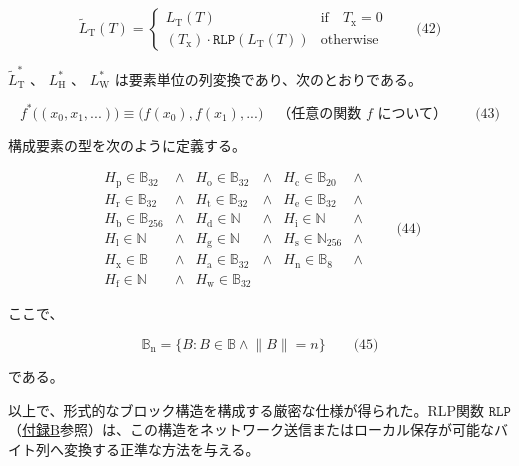 \documentclass[
]{ltjsarticle}
\begin{document}
\protect\hypertarget{eq-42}{}{}

\[\widetilde{L}_{\mathrm{T}}(T) = \begin{cases}
L_{\mathrm{T}}(T) & \text{if} \quad T_{\mathrm{x}} = 0 \\
(T_{\mathrm{x}}) \cdot \mathtt{RLP}(L_{\mathrm{T}}(T)) & \text{otherwise}
\end{cases} \qquad \text{(42)}\]

\protect\hypertarget{general_element_wise_sequence_transformation_f_pow_asterisk}{}{}
\(\widetilde{L}_{\mathrm{T}}^{*}\) 、 \(L_{\mathrm{H}}^{*}\) 、
\(L_{\mathrm{W}}^{*}\) は要素単位の列変換であり、次のとおりである。

\protect\hypertarget{eq-43}{}{}

\[f^{*}\big( (x_0, x_1, ...) \big) \equiv \big( f(x_0), f(x_1), ... \big) \quad \text{（任意の関数 } f \text{ について）} \qquad \text{(43)}\]

構成要素の型を次のように定義する。

\protect\hypertarget{eq-44}{}{}

\[\begin{array}{lclclcl}
H_{\mathrm{p}} \in \mathbb{B}_{32} & \wedge & H_{\mathrm{o}} \in \mathbb{B}_{32} & \wedge & H_{\mathrm{c}} \in \mathbb{B}_{20} & \wedge \\
H_{\mathrm{r}} \in \mathbb{B}_{32} & \wedge & H_{\mathrm{t}} \in \mathbb{B}_{32} & \wedge & H_{\mathrm{e}} \in \mathbb{B}_{32} & \wedge \\
H_{\mathrm{b}} \in \mathbb{B}_{256} & \wedge & H_{\mathrm{d}} \in \mathbb{N} & \wedge & H_{\mathrm{i}} \in \mathbb{N} & \wedge \\
H_{\mathrm{l}} \in \mathbb{N} & \wedge & H_{\mathrm{g}} \in \mathbb{N} & \wedge & H_{\mathrm{s}} \in \mathbb{N}_{256} & \wedge \\
H_{\mathrm{x}} \in \mathbb{B} & \wedge & H_{\mathrm{a}} \in \mathbb{B}_{32} & \wedge & H_{\mathrm{n}} \in \mathbb{B}_{8} & \wedge \\
H_{\mathrm{f}} \in \mathbb{N} & \wedge & H_{\mathrm{w}} \in \mathbb{B}_{32}
\end{array} \qquad \text{(44)}\]

ここで、

\protect\hypertarget{eq-45}{}{}

\[\mathbb{B}_{\mathrm{n}} = \{ B: B \in \mathbb{B} \wedge \lVert B \rVert = n \} \qquad \text{(45)}\]

である。

以上で、形式的なブロック構造を構成する厳密な仕様が得られた。RLP関数
\(\texttt{RLP}\)
（\protect\hyperlink{app:rlp}{付録B}参照）は、この構造をネットワーク送信またはローカル保存が可能なバイト列へ変換する正準な方法を与える。
\end{document}
